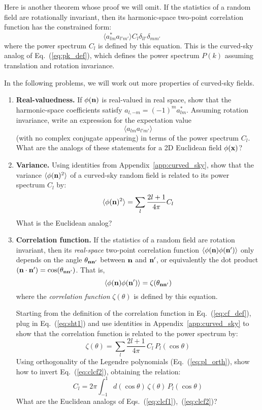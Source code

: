\documentclass[aps,prd,superscriptaddress,groupedaddress,nofootinbib,nobibnotes]{revtex4}
\newcommand{\be}{\begin{equation}}
\newcommand{\ee}{\end{equation}}
\def\x{{\bf x}}
\def\n{{\bf n}}
\begin{document}
Here is another theorem whose proof we will omit.
If the statistics of a random field are rotationally invariant, then its harmonic-space two-point
correlation function has the constrained form:
\be
\langle a_{l m}^* a_{l'm'} \rangle C_l \delta_{ll'} \delta_{mm'}   \label{eq:cl_def}
\ee
where the power spectrum $C_l$ is defined by this equation.  This is the curved-sky analog of
Eq.~(\ref{eq:pk_def}), which defines the power spectrum $P(k)$ assuming translation and rotation
invariance.

In the following problems, we will work out more properties of curved-sky fields.

\begin{enumerate}

\item {\bf Real-valuedness.} If $\phi(\n)$ is real-valued in real space, show that the harmonic-space 
 coefficients satisfy $a_{l,-m} = (-1)^m a_{lm}^*$.  Assuming rotation invariance, write an expression 
 for the expectation value
\be
\langle a_{lm} a_{l'm'} \rangle
\ee
 (with no complex conjugate appearing) in terms of the power spectrum $C_l$.  
 What are the analogs of these statements for a 2D Euclidean field $\phi(\x)$?

\item {\bf Variance.} Using identities from Appendix~\ref{app:curved_sky}, show that the variance 
 $\langle \phi(\n)^2 \rangle$ of a curved-sky random field is related to its power spectrum $C_l$ by:
\be
\langle \phi(\n)^2 \rangle = \sum_l \frac{2l+1}{4\pi} C_l
\ee
 What is the Euclidean analog?

\item {\bf Correlation function.} If the statistics of a random field are rotation invariant, then its {\em real-space}
 two-point correlation function $\langle \phi(\n) \phi(\n') \rangle$ only depends on the angle
 $\theta_{\n\n'}$ between $\n$ and $\n'$, or equivalently the dot product $(\n\cdot\n') = \cos(\theta_{\n\n'})$.  
 That is,
\be
 \langle \phi(\n) \phi(\n') \rangle = \zeta(\theta_{\n\n'})  \label{eq:cf_def}
\ee
 where the {\em correlation function} $\zeta(\theta)$ is defined by this equation.

 Starting from the definition of the correlation function in Eq.~(\ref{eq:cf_def}),
 plug in Eq.~(\ref{eq:sht1}) and use identities in Appendix~\ref{app:curved_sky}
 to show that the correlation function is related to the power spectrum by:
\be
 \zeta(\theta) = \sum_l \frac{2l+1}{4\pi} \, C_l \, P_l(\cos\theta)  \label{eq:clcf1}
\ee
 Using orthogonality of the Legendre polynomials (Eq.~(\ref{eq:pl_orth}), show how
 to invert Eq.~(\ref{eq:clcf2}), obtaining the relation:
\be
C_l = 2\pi \int_{-1}^1 d(\cos\theta) \, \zeta(\theta) \, P_l(\cos\theta)  \label{eq:clcf2}
\ee
 What are the Euclidean analogs of Eqs.~(\ref{eq:clcf1}),~(\ref{eq:clcf2})?


\end{enumerate}
\end{document}
